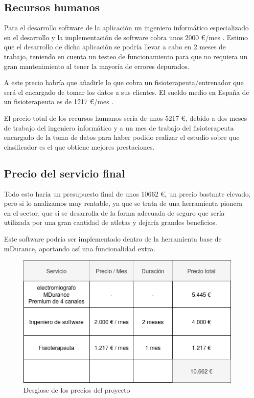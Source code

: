 \subsection{Recursos humanos}
Para el desarrollo software de la aplicación un ingeniero informático especializado en el desarrollo y la implementación de software cobra unos 2000 \euro/mes  \cite{salarioinformatico}. Estimo que el desarrollo de dicha aplicación se podría llevar a cabo en 2 meses de trabajo, teniendo en cuenta un testeo de funcionamiento para que no requiera un gran mantenimiento al tener la mayoría de errores depurados.

A este precio habría que añadirle lo que cobra un fisioterapeuta/entrenador que será el encargado de tomar los datos a sus clientes. El sueldo medio en España de un fisioterapeuta es de 1217 \euro/mes \cite{salariofisio}.

El precio total de los recursos humanos seria de unos 5217 \euro, debido a dos meses de trabajo del ingeniero informático y a un mes de trabajo del fisioterapeuta encargado de la toma de datos para haber podido realizar el estudio sobre que clasificador es el que obtiene mejores prestaciones.

\subsection{Precio del servicio final}

Todo esto haría un presupuesto final de unos 10662 \euro, un precio bastante elevado, pero si lo analizamos muy rentable, ya que se trata de una herramienta pionera en el sector, que si se desarrolla de la forma adecuada de seguro que sería utilizada por una gran cantidad de atletas y dejaría grandes beneficios.

Este software podría ser implementado dentro de la herramienta base de mDurance, aportando así una funcionalidad extra.


\begin{figure}[ht]
\centering
\includegraphics[scale=0.6]{imagenes/precio total.png}
\caption{ Desglose de los precios del proyecto}
\label{fig:precios}
\end{figure}






